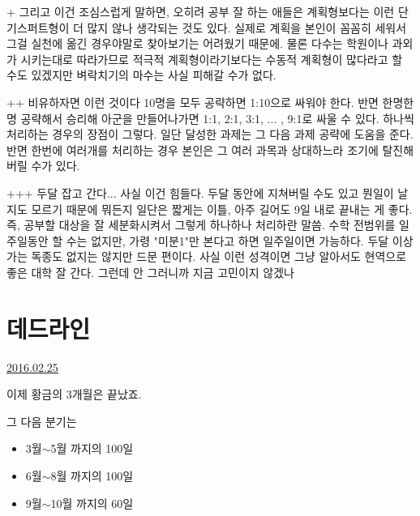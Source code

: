 + 그리고 이건 조심스럽게 말하면, 오히려 공부 잘 하는 애들은 계획형보다는 이런 단기스퍼트형이 더 많지 않나 생각되는 것도 있다.
실제로 계획을 본인이 꼼꼼히 세워서 그걸 실천에 옮긴 경우야말로 찾아보기는 어려웠기 때문에.
물론 다수는 학원이나 과외가 시키는대로 따라가므로 적극적 계획형이라기보다는 수동적 계획형이 많다라고 할 수도 있겠지만
벼락치기의 마수는 사실 피해갈 수가 없다.
\vspace{5mm}

++ 비유하자면 이런 것이다 10명을 모두 공략하면 1:10으로 싸워야 한다.
반면 한명한명 공략해서 승리해 아군을 만들어나가면 1:1, 2:1, 3:1, ... , 9:1로 싸울 수 있다.
하나씩 처리하는 경우의 장점이 그렇다. 일단 달성한 과제는 그 다음 과제 공략에 도움을 준다.
반면 한번에 여러개를 처리하는 경우 본인은 그 여러 과목과 상대하느라 조기에 탈진해버릴 수가 있다.
\vspace{5mm}

+++ 두달 잡고 간다... 사실 이건 힘들다. 두달 동안에 지쳐버릴 수도 있고 뭔일이 날지도 모르기 때문에
뭐든지 일단은 짧게는 이틀, 아주 길어도 9일 내로 끝내는 게 좋다. 즉, 공부할 대상을 잘 세분화시켜서 그렇게 하나하나 처리하란 말씀.
수학 전범위를 일주일동안 할 수는 없지만, 가령 "미분1"만 본다고 하면 일주일이면 가능하다.
두달 이상 가는 독종도 없지는 않지만 드문 편이다. 사실 이런 성격이면 그냥 알아서도 현역으로 좋은 대학 잘 간다.
그런데 안 그러니까 지금 고민이지 않겠나
\vspace{5mm}












\section{데드라인}
\href{https://www.kockoc.com/Apoc/650700}{2016.02.25}

\vspace{5mm}

이제 황금의 3개월은 끝났죠.
\vspace{5mm}

그 다음 분기는
\begin{itemize}
    \item 3월$\sim$5월 까지의 100일
    \item 6월$\sim$8월 까지의 100일
    \item 9월$\sim$10월 까지의 60일
\end{itemize}
\vspace{5mm}

